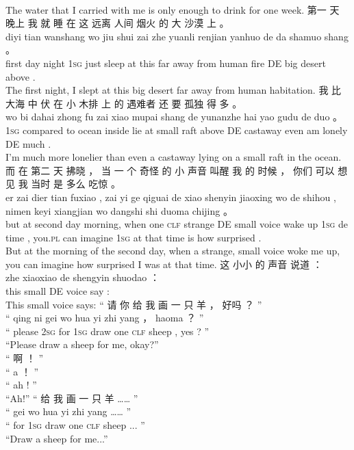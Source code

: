 \documentclass[UTF8]{ctexart}
\begin{document}
\begin{exe}
\\
\trans The water that I carried with me is only enough to drink for one week. 
\ex
\glll
第一 天 晚上 我 就 睡 在 这 远离 人间 烟火 的 大 沙漠 上 。
\\
diyi tian wanshang wo jiu shui zai zhe yuanli renjian yanhuo de da shamuo shang 。
\\
first day night \textsc{1sg} just sleep at this {far away from} human fire DE big desert above .
\\
\trans The first night, I slept at this big desert far away from human habitation.
\ex
\glll
我 比 大海 中 伏 在 小 木排 上 的 遇难者 还 要 孤独 得 多 。
\\
wo bi dahai zhong fu zai xiao mupai shang de yunanzhe hai yao gudu de duo 。
\\
\textsc{1sg} {compared to} ocean inside lie at small raft above DE castaway even am lonely DE much .
\\
\trans I'm much more lonelier than even a castaway lying on a small raft in the ocean. 
\ex
\glll
而 在 第二 天 拂晓 ， 当 一 个 奇怪 的 小 声音 叫醒 我 的 时候 ， 你们 可以 想见 我 当时 是 多么 吃惊 。
\\
er zai dier tian fuxiao , zai yi ge qiguai de xiao shenyin jiaoxing wo de shihou , nimen keyi xiangjian wo dangshi shi duoma chijing 。
\\
but at second day morning, when one \textsc{clf} strange DE small voice {wake up} \textsc{1sg} de time , {you.\textsc{pl}} can imagine \textsc{1sg} {at that time} is how surprised . 
\\
\trans But at the morning of the second day, when a strange, small voice woke me up, you can imagine how surprised I was at that time. 
\ex
\glll
这 小小 的 声音 说道 ：
\\
zhe xiaoxiao de shengyin shuodao ：
\\
this small DE voice say :
\\
\trans This small voice says:
\ex
\glll
“ 请 你 给 我 画 一 只 羊 ， 好吗 ？ ”
\\
“ qing ni gei wo hua yi zhi yang ， haoma ？ ”
\\
`` please \textsc{2sg} for \textsc{1sg} draw one \textsc{clf} sheep , yes ? ''
\\
\trans ``Please draw a sheep for me, okay?''\\
\ex
\glll
“ 啊 ！ ”
\\
“ a ！ ”
\\
`` ah ! ''
\\
\trans ``Ah!''
\ex
\glll
“ 给 我 画 一 只 羊 …… ”
\\
“ gei wo hua yi zhi yang …… ”
\\
`` for \textsc{1sg} draw one \textsc{clf} sheep ... ''
\\
\trans ``Draw a sheep for me...''
\end{exe}
\end{document}
